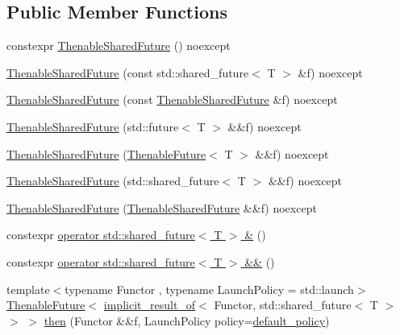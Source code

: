 \subsection*{Public Member Functions}
\begin{DoxyCompactItemize}
\item 
constexpr \hyperlink{classthenable_1_1_thenable_shared_future_a44430012855789b78afce4dce6fa27fe}{Thenable\+Shared\+Future} () noexcept
\item 
\hyperlink{classthenable_1_1_thenable_shared_future_a754294e043ca43dd8b6f4cb1a592072f}{Thenable\+Shared\+Future} (const std\+::shared\+\_\+future$<$ T $>$ \&f) noexcept
\item 
\hyperlink{classthenable_1_1_thenable_shared_future_a163f4c1e38e309eb307e6d92f05ca64c}{Thenable\+Shared\+Future} (const \hyperlink{classthenable_1_1_thenable_shared_future}{Thenable\+Shared\+Future} \&f) noexcept
\item 
\hyperlink{classthenable_1_1_thenable_shared_future_a595a43fe55c970694c0b9af5eb52d2ac}{Thenable\+Shared\+Future} (std\+::future$<$ T $>$ \&\&f) noexcept
\item 
\hyperlink{classthenable_1_1_thenable_shared_future_a0da9026f90c669869bcbcc4827df2d0c}{Thenable\+Shared\+Future} (\hyperlink{classthenable_1_1_thenable_future}{Thenable\+Future}$<$ T $>$ \&\&f) noexcept
\item 
\hyperlink{classthenable_1_1_thenable_shared_future_a0a6f2dc98dcbb177c590ef49191a511a}{Thenable\+Shared\+Future} (std\+::shared\+\_\+future$<$ T $>$ \&\&f) noexcept
\item 
\hyperlink{classthenable_1_1_thenable_shared_future_acbbd8fe47ccd6a8a5512d0e725dd6fac}{Thenable\+Shared\+Future} (\hyperlink{classthenable_1_1_thenable_shared_future}{Thenable\+Shared\+Future} \&\&f) noexcept
\item 
constexpr \hyperlink{classthenable_1_1_thenable_shared_future_ac0fd0a51c6c8e4fd434c8942f2e0a34a}{operator std\+::shared\+\_\+future$<$ T $>$ \&} ()
\item 
constexpr \hyperlink{classthenable_1_1_thenable_shared_future_a4805c90240683e4883c31754569b0f05}{operator std\+::shared\+\_\+future$<$ T $>$ \&\&} ()
\item 
{\footnotesize template$<$typename Functor , typename Launch\+Policy  = std\+::launch$>$ }\\\hyperlink{classthenable_1_1_thenable_future}{Thenable\+Future}$<$ \hyperlink{namespacethenable_a1ecf08d6ad8b8688d7b4df047b5feaae}{implicit\+\_\+result\+\_\+of}$<$ Functor, std\+::shared\+\_\+future$<$ T $>$ $>$ $>$ \hyperlink{classthenable_1_1_thenable_shared_future_a002763be3a45b4c038f687b425c227f8}{then} (Functor \&\&f, Launch\+Policy policy=\hyperlink{namespacethenable_a55a20a452e9ba9c0eff946d9b8636f06}{default\+\_\+policy})
\end{DoxyCompactItemize}


